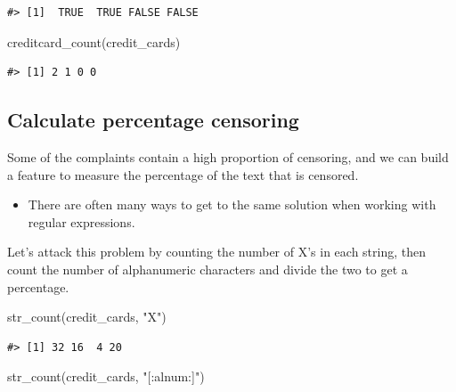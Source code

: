 \documentclass[
]{krantz}
\makeatletter
\newenvironment{Shaded}{\begin{snugshade}}{\end{snugshade}}
\newcommand{\FunctionTok}[1]{\textcolor[rgb]{0.00,0.00,0.00}{#1}}
\newcommand{\NormalTok}[1]{#1}
\newcommand{\StringTok}[1]{\textcolor[rgb]{0.31,0.60,0.02}{#1}}
\newenvironment{kframe}{%
\medskip{}
\setlength{\fboxsep}{.8em}
 \def\at@end@of@kframe{}%
 \ifinner\ifhmode%
  \def\at@end@of@kframe{\end{minipage}}%
  \begin{minipage}{\columnwidth}%
 \fi\fi%
 \def\FrameCommand##1{\hskip\@totalleftmargin \hskip-\fboxsep
 \colorbox{shadecolor}{##1}\hskip-\fboxsep
     \hskip-\linewidth \hskip-\@totalleftmargin \hskip\columnwidth}%
 \MakeFramed {\advance\hsize-\width
   \@totalleftmargin\z@ \linewidth\hsize
   \@setminipage}}%
 {\par\unskip\endMakeFramed%
 \at@end@of@kframe}
\renewenvironment{Shaded}{\begin{kframe}}{\end{kframe}}
\newenvironment{rmdblock}[1]
  {\begin{shaded*}
  \begin{itemize}[left = -1cm, labelsep = 1cm]
  \renewcommand{\labelitemi}{
    \raisebox{-.7\height}[0pt][0pt]{
      {\setkeys{Gin}{width=3em,keepaspectratio}\texttt{[image: images/\#1]}}
    }
  }
 
  \item
  }
  {
  \end{itemize}
  \end{shaded*}
  }
\newenvironment{rmdwarning}
  {\begin{rmdblock}{warning}}
  {\end{rmdblock}}
\makeatother
\begin{document}
\begin{verbatim}
#> [1]  TRUE  TRUE FALSE FALSE
\end{verbatim}

\begin{Shaded}
\begin{Highlighting}[]
\FunctionTok{creditcard\_count}\NormalTok{(credit\_cards)}
\end{Highlighting}
\end{Shaded}

\begin{verbatim}
#> [1] 2 1 0 0
\end{verbatim}

\hypertarget{calculate-percentage-censoring}{%
\subsection{Calculate percentage censoring}\label{calculate-percentage-censoring}}

Some of the complaints contain a high proportion of censoring, and we can build a feature to measure the percentage of the text that is censored.

\begin{rmdwarning}
There are often many ways to get to the same solution when working with
regular expressions.
\end{rmdwarning}


Let's attack this problem by counting the number of X's in each string, then count the number of alphanumeric characters and divide the two to get a percentage.

\begin{Shaded}
\begin{Highlighting}[]
\FunctionTok{str\_count}\NormalTok{(credit\_cards, }\StringTok{"X"}\NormalTok{)}
\end{Highlighting}
\end{Shaded}

\begin{verbatim}
#> [1] 32 16  4 20
\end{verbatim}

\begin{Shaded}
\begin{Highlighting}[]
\FunctionTok{str\_count}\NormalTok{(credit\_cards, }\StringTok{"[:alnum:]"}\NormalTok{)}
\end{Highlighting}
\end{Shaded}
\end{document}
